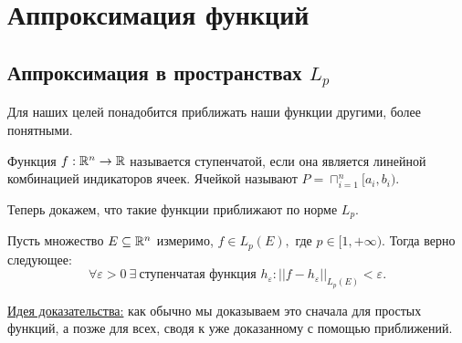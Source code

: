 \section{Аппроксимация функций}
\subsection{Аппроксимация в пространствах $L_p$}
Для наших целей понадобится приближать наши функции другими, более понятными.

\begin{definition}
    Функция $f : \mathbb{R}^{n} \rightarrow \mathbb{R}$ называется ступенчатой, если она является линейной комбинацией индикаторов ячеек. Ячейкой называют $P = \sqcap_{i=1}^n[a_i, b_i)$.
\end{definition}

Теперь докажем, что такие функции приближают по норме $L_p$.

\begin{theorem}
    Пусть множество $E \subseteq \mathbb{R}^n$ измеримо, $f \in L_p(E), $ где $p \in [1, +\infty)$.
    Тогда верно следующее:
    $$\forall \varepsilon > 0 \ \exists \ \text{ступенчатая функция } h_{\varepsilon} : ||f - h_{\varepsilon}||_{L_p(E)} < \varepsilon.$$
\end{theorem}

\underline{Идея доказательства:} как обычно мы доказываем это сначала для простых функций, а позже для всех, сводя к уже доказанному с помощью приближений.


